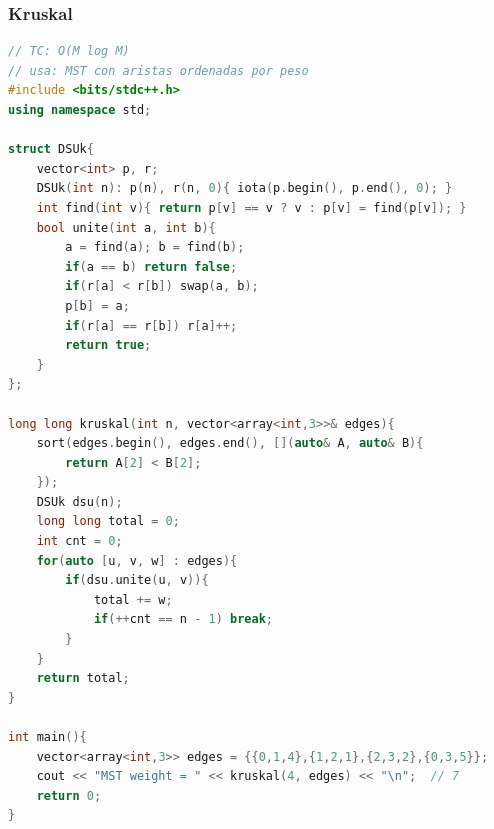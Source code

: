 \subsubsection{Kruskal}
\begin{lstlisting}[style=mystyle, language=C++]
// TC: O(M log M)
// usa: MST con aristas ordenadas por peso
#include <bits/stdc++.h>
using namespace std;

struct DSUk{
	vector<int> p, r;
	DSUk(int n): p(n), r(n, 0){ iota(p.begin(), p.end(), 0); }
	int find(int v){ return p[v] == v ? v : p[v] = find(p[v]); }
	bool unite(int a, int b){
		a = find(a); b = find(b);
		if(a == b) return false;
		if(r[a] < r[b]) swap(a, b);
		p[b] = a;
		if(r[a] == r[b]) r[a]++;
		return true;
	}
};

long long kruskal(int n, vector<array<int,3>>& edges){
	sort(edges.begin(), edges.end(), [](auto& A, auto& B){
		return A[2] < B[2];
	});
	DSUk dsu(n);
	long long total = 0;
	int cnt = 0;
	for(auto [u, v, w] : edges){
		if(dsu.unite(u, v)){
			total += w;
			if(++cnt == n - 1) break;
		}
	}
	return total;
}

int main(){
	vector<array<int,3>> edges = {{0,1,4},{1,2,1},{2,3,2},{0,3,5}};
	cout << "MST weight = " << kruskal(4, edges) << "\n";  // 7
	return 0;
}
\end{lstlisting}
